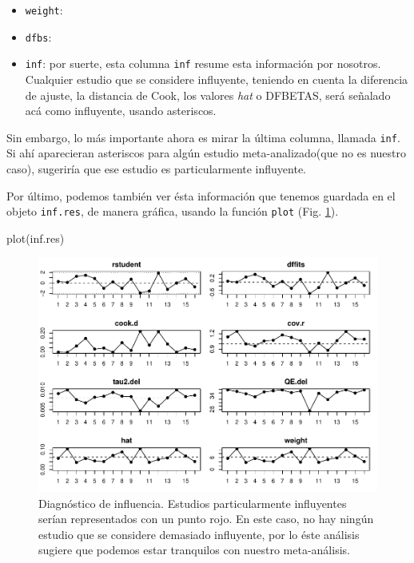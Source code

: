 \documentclass[
  bookmarksnumbered]{article}
\newenvironment{Shaded}{\begin{snugshade}}{\end{snugshade}}
\newcommand{\FunctionTok}[1]{\textcolor[rgb]{0.39,0.29,0.61}{#1}}
\newcommand{\NormalTok}[1]{\textcolor[rgb]{0.12,0.11,0.11}{#1}}
\begin{document}
\begin{itemize}
\item
  \texttt{weight}:
\item
  \texttt{dfbs}:
\item
  \texttt{inf}: por suerte, esta columna \texttt{inf} resume esta información por nosotros. Cualquier estudio que se considere influyente, teniendo en cuenta la diferencia de ajuste, la distancia de Cook, los valores \emph{hat} o DFBETAS, será señalado acá como influyente, usando asteriscos.
\end{itemize}

Sin embargo, lo más importante ahora es mirar la última columna, llamada \texttt{inf}. Si ahí aparecieran asteriscos para algún estudio meta-analizado(que no es nuestro caso), sugeriría que ese estudio es particularmente influyente.

Por último, podemos también ver ésta información que tenemos guardada en el objeto \texttt{inf.res}, de manera gráfica, usando la función \texttt{plot} (Fig. \ref{fig:infplot}).

\begin{Shaded}
\begin{Highlighting}[]
\FunctionTok{plot}\NormalTok{(inf.res)}
\end{Highlighting}
\end{Shaded}

\begin{figure}
\centering
\includegraphics{Meta-analysis_files/figure-latex/infplot-1.pdf}
\caption{\label{fig:infplot}Diagnóstico de influencia. Estudios particularmente influyentes serían representados con un punto rojo. En este caso, no hay ningún estudio que se considere demasiado influyente, por lo éste análisis sugiere que podemos estar tranquilos con nuestro meta-análisis.}
\end{figure}
\end{document}
